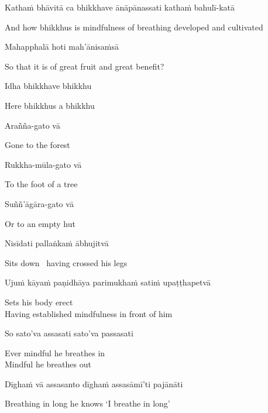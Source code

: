 Kathaṁ bhāvitā ca bhikkhave ānāpānassati kathaṁ bahulī-katā

\begin{english-hang}
  And how bhikkhus is mindfulness of breathing developed and cultivated
\end{english-hang}

Mahapphalā hoti mah'ānisaṁsā

\begin{english}
  So that it is of great fruit and great benefit?
\end{english}

Idha bhikkhave bhikkhu

\begin{english}
  Here bhikkhus a bhikkhu
\end{english}

Arañña-gato vā

\begin{english}
  Gone to the forest
\end{english}

Rukkha-mūla-gato vā

\begin{english}
  To the foot of a tree
\end{english}

Suññ'āgāra-gato vā

\begin{english}
  Or to an empty hut
\end{english}

Nisīdati pallaṅkaṁ ābhujitvā

\begin{english}
  Sits down \breathmark\ having crossed his legs
\end{english}

Ujuṁ kāyaṁ paṇidhāya parimukhaṁ satiṁ upaṭṭhapetvā

\begin{english}
  Sets his body erect\\
  Having established mindfulness in front of him
\end{english}

So sato'va assasati sato'va passasati

\begin{english}
  Ever mindful he breathes in\\
  Mindful he breathes out
\end{english}

Dīghaṁ vā assasanto dīghaṁ assasāmī'ti pajānāti

\begin{english}
  Breathing in long he knows `I breathe in long'
\end{english}

